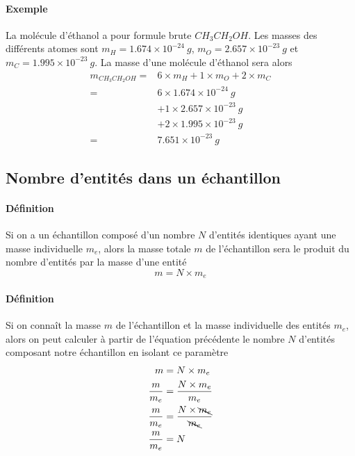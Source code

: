 \paragraph{Exemple} La molécule d'éthanol a pour formule brute $CH_3CH_2OH$. Les masses des différents atomes sont $m_H =  1.674 \times 10^{-24}~g$, $m_O =  2.657 \times 10^{-23}~g$ et $m_C =  1.995 \times 10^{-23}~g$. La masse d'une molécule d'éthanol sera alors 
\begin{equation*}
    \begin{aligned}
      m_{CH_3CH_2OH} 	=&  6 \times m_H + 1 \times m_O + 2 \times m_C\\
			=& 6 \times 1.674 \times 10^{-24}~g \\ 
			&+ 1 \times 2.657 \times 10^{-23}~g  \\
			&+ 2 \times  1.995 \times 10^{-23}~g\\
			 =& 7.651 \times 10^{-23}~g     
    \end{aligned}
\end{equation*}

\subsection{Nombre d'entités dans un échantillon}
\paragraph{Définition} Si on a un échantillon composé d'un nombre $N$ d'entités identiques ayant une masse individuelle $m_e$, alors la masse totale $m$ de l'échantillon sera le produit du nombre d'entités par la masse d'une entité
$$ m = N \times m_e$$

\paragraph{Définition} Si on connaît la masse $m$ de l'échantillon et la masse individuelle des entités $m_e$, alors on peut calculer à partir de l'équation précédente le nombre $N$ d'entités composant notre échantillon en isolant ce paramètre
\begin{equation*}
    \begin{aligned}
	  m &= N \times m_e \\
	  \frac{m}{m_e} &= \frac{N \times m_e}{m_e} \\
	  \frac{m}{m_e} &= \frac{N \times \bcancel{m_e}}{\bcancel{m_e}} \\
	  \frac{m}{m_e} &= N  
    \end{aligned}
\end{equation*}

